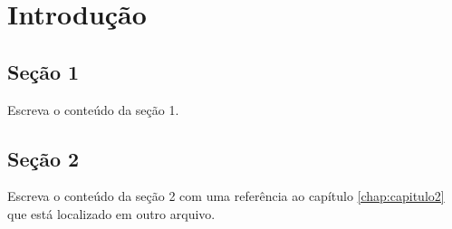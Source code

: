

\chapter{\hspace*{3pt} Introdução}\label{chap:introducao}


\section{\hspace*{3pt} Seção 1}\label{sec:secao1}

Escreva o conteúdo da seção 1.

\section{\hspace*{3pt}Seção 2}\label{sec:secao2}

Escreva o conteúdo da seção 2 com uma referência ao capítulo \ref{chap:capitulo2} que está localizado em outro arquivo.


